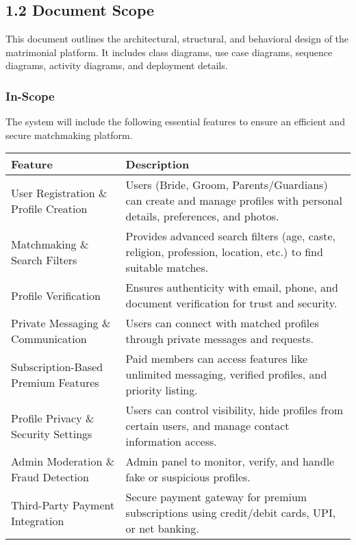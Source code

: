 \subsection{1.2 Document Scope}\label{document-scope}

This document outlines the architectural, structural, and behavioral
design of the matrimonial platform. It includes class diagrams, use case
diagrams, sequence diagrams, activity diagrams, and deployment details.

\subsubsection{In-Scope}\label{in-scope}

The system will include the following essential features to ensure an
efficient and secure matchmaking platform.

\begin{longtable}[]{@{}
  >{\raggedright\arraybackslash}p{}
  >{\raggedright\arraybackslash}p{}@{}}
\toprule\noalign{}
\begin{minipage}[b]{\linewidth}\raggedright
Feature
\end{minipage} & \begin{minipage}[b]{\linewidth}\raggedright
Description
\end{minipage} \\
\midrule\noalign{}
\endhead
\bottomrule\noalign{}
\endlastfoot
User Registration \& Profile Creation & Users (Bride, Groom,
Parents/Guardians) can create and manage profiles with personal details,
preferences, and photos. \\
Matchmaking \& Search Filters & Provides advanced search filters (age,
caste, religion, profession, location, etc.) to find suitable
matches. \\
Profile Verification & Ensures authenticity with email, phone, and
document verification for trust and security. \\
Private Messaging \& Communication & Users can connect with matched
profiles through private messages and requests. \\
Subscription-Based Premium Features & Paid members can access features
like unlimited messaging, verified profiles, and priority listing. \\
Profile Privacy \& Security Settings & Users can control visibility,
hide profiles from certain users, and manage contact information
access. \\
Admin Moderation \& Fraud Detection & Admin panel to monitor, verify,
and handle fake or suspicious profiles. \\
Third-Party Payment Integration & Secure payment gateway for premium
subscriptions using credit/debit cards, UPI, or net banking. \\
\end{longtable}

